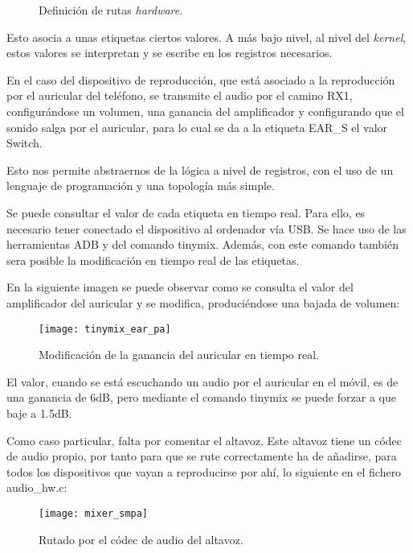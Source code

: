\begin{figure}[H]
	\centering
	\caption{Definición de rutas \textit{hardware}.} \label{fig:definicion_rutas_mixer}
\end{figure}

Esto asocia a unas etiquetas ciertos valores. A más bajo nivel, al nivel del \textit{kernel}, estos valores se interpretan y se escribe en los registros necesarios.

En el caso del dispositivo de reproducción, que está asociado a la reproducción por el auricular del teléfono, se transmite el audio por el camino RX1, configurándose un volumen, una ganancia del amplificador y configurando que el sonido salga por el auricular, para lo cual se da a la etiqueta EAR\_S el valor Switch.

Esto nos permite abstraernos de la lógica a nivel de registros, con el uso de un lenguaje de programación y una topología más simple.

Se puede consultar el valor de cada etiqueta en tiempo real. Para ello, es necesario tener conectado el dispositivo al ordenador vía \gls{USB}. Se hace uso de las herramientas \gls{ADB} y del comando tinymix. Además, con este comando también sera posible la modificación en tiempo real de las etiquetas.

En la siguiente imagen se puede observar como se consulta el valor del amplificador del auricular y se modifica, produciéndose una bajada de volumen:

\begin{figure}[H]
	\centering
	\texttt{[image: tinymix\_ear\_pa]}
	\caption{Modificación de la ganancia del auricular en tiempo real.} 
	\label{fig:tinymix_ear_pa}
\end{figure}

El valor, cuando se está escuchando un audio por el auricular en el móvil, es de una ganancia de 6\gls{dB}, pero mediante el comando tinymix se puede forzar a que baje a 1.5\gls{dB}.

Como caso particular, falta por comentar el altavoz. Este altavoz tiene un códec de audio propio, por tanto para que se rute correctamente ha de añadirse, para todos los dispositivos que vayan a reproducirse por ahí, lo siguiente en el fichero audio\_hw.c:

\begin{figure}[H]
	\centering
	\texttt{[image: mixer\_smpa]}
	\caption{Rutado por el códec de audio del altavoz.} 
	\label{fig:mixer_smpa}
\end{figure}

